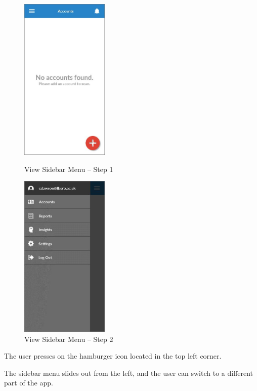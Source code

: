 \begin{figure}
  \subfigures
  \centering
  \begin{minipage}{4.6cm}
    \centering
    \includegraphics[width=4.2cm]{inc/ui_sb_step1.jpg}
    \caption{View Sidebar Menu -- Step 1}
    \label{fig:ui_sb_step1}
  \end{minipage}
  \begin{minipage}{4.6cm}
    \centering
    \includegraphics[width=4.2cm]{inc/ui_sb_step2.jpg}
    \caption{View Sidebar Menu -- Step 2}
    \label{fig:ui_sb_step2}
  \end{minipage}
\end{figure}

\begin{minipage}{\textwidth}
  \centering
  \begin{minipage}[t]{4.6cm}
    \vspace{0pt}
    \centering
    \begin{minipage}{4.4cm}
      The user presses on the hamburger icon located in the top left corner.
    \end{minipage}
  \end{minipage}
  \begin{minipage}[t]{4.6cm}
    \vspace{0pt}
    \centering
    \begin{minipage}{4.4cm}
      The sidebar menu slides out from the left, and the user can switch to a different part of the app.
    \end{minipage}
  \end{minipage}
\end{minipage}

